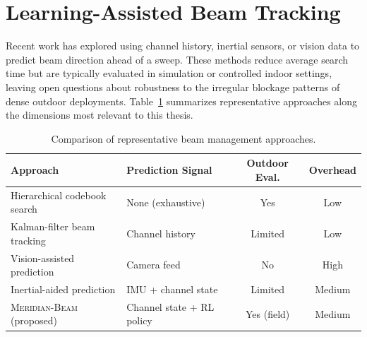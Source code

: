\section{Learning-Assisted Beam Tracking}
Recent work has explored using channel history, inertial sensors, or vision
data to predict beam direction ahead of a sweep. These methods reduce average
search time but are typically evaluated in simulation or controlled indoor
settings, leaving open questions about robustness to the irregular blockage
patterns of dense outdoor deployments. Table~\ref{tab:related} summarizes
representative approaches along the dimensions most relevant to this thesis.

\begin{table}[htbp]
\centering
\caption{Comparison of representative beam management approaches.}
\label{tab:related}
\small
\begin{tabularx}{\textwidth}{@{}lXcc@{}}
\toprule
\textbf{Approach} & \textbf{Prediction Signal} & \textbf{Outdoor Eval.} & \textbf{Overhead} \\
\midrule
Hierarchical codebook search & None (exhaustive) & Yes & Low \\
Kalman-filter beam tracking & Channel history & Limited & Low \\
Vision-assisted prediction & Camera feed & No & High \\
Inertial-aided prediction & IMU + channel state & Limited & Medium \\
\rowcolor{kupale} \textsc{Meridian-Beam} (proposed) & Channel state + RL policy & Yes (field) & Medium \\
\bottomrule
\end{tabularx}
\end{table}
